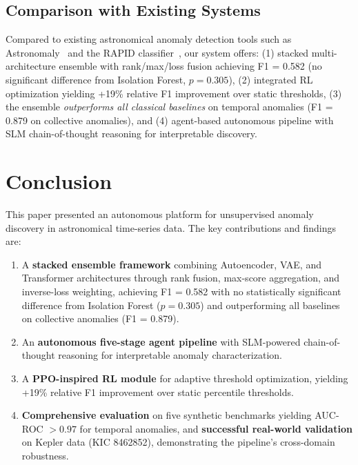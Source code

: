 \documentclass[conference]{IEEEtran}
\begin{document}
\subsection{Comparison with Existing Systems}

Compared to existing astronomical anomaly detection tools such as Astronomaly~\cite{lochner2021astronomaly} and the RAPID classifier~\cite{muthukrishna2019rapid}, our system offers: (1) stacked multi-architecture ensemble with rank/max/loss fusion achieving F1 = 0.582 (no significant difference from Isolation Forest, $p = 0.305$), (2) integrated RL optimization yielding +19\% relative F1 improvement over static thresholds, (3) the ensemble \textit{outperforms all classical baselines} on temporal anomalies (F1 = 0.879 on collective anomalies), and (4) agent-based autonomous pipeline with SLM chain-of-thought reasoning for interpretable discovery.

\section{Conclusion}
\label{sec:conclusion}

This paper presented an autonomous platform for unsupervised anomaly discovery in astronomical time-series data. The key contributions and findings are:

\begin{enumerate}
    \item A \textbf{stacked ensemble framework} combining Autoencoder, VAE, and Transformer architectures through rank fusion, max-score aggregation, and inverse-loss weighting, achieving F1 = 0.582 with no statistically significant difference from Isolation Forest ($p = 0.305$) and outperforming all baselines on collective anomalies (F1 = 0.879).
    \item An \textbf{autonomous five-stage agent pipeline} with SLM-powered chain-of-thought reasoning for interpretable anomaly characterization.
    \item A \textbf{PPO-inspired RL module} for adaptive threshold optimization, yielding +19\% relative F1 improvement over static percentile thresholds.
    \item \textbf{Comprehensive evaluation} on five synthetic benchmarks yielding AUC-ROC $> 0.97$ for temporal anomalies, and \textbf{successful real-world validation} on Kepler data (KIC 8462852), demonstrating the pipeline's cross-domain robustness.
\end{enumerate}
\end{document}
